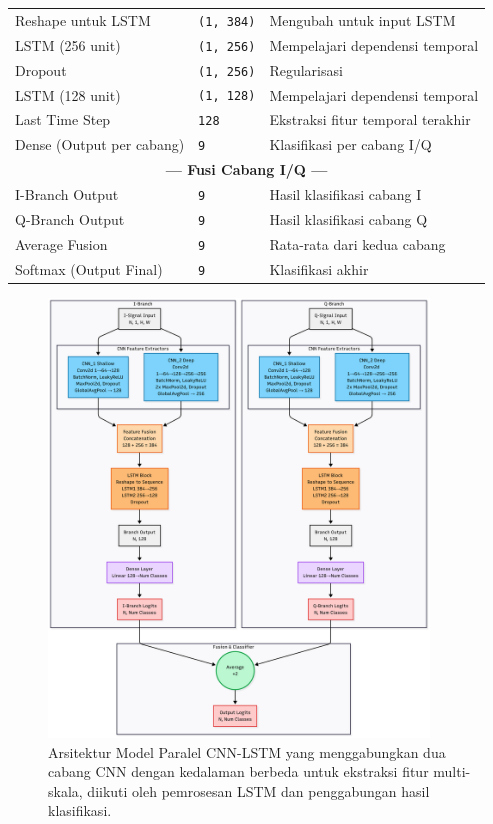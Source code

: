 \documentclass{article}
\begin{document}
\begin{table}[h]
\begin{tabular}{|l|l|l|}
Reshape untuk LSTM & \texttt{(1, 384)} & Mengubah untuk input LSTM \\
LSTM (256 unit) & \texttt{(1, 256)} & Mempelajari dependensi temporal \\
Dropout & \texttt{(1, 256)} & Regularisasi \\
LSTM (128 unit) & \texttt{(1, 128)} & Mempelajari dependensi temporal \\
Last Time Step & \texttt{128} & Ekstraksi fitur temporal terakhir \\
Dense (Output per cabang) & \texttt{9} & Klasifikasi per cabang I/Q \\
\hline
\multicolumn{3}{|c|}{\textbf{--- Fusi Cabang I/Q ---}} \\
\hline
I-Branch Output & \texttt{9} & Hasil klasifikasi cabang I \\
Q-Branch Output & \texttt{9} & Hasil klasifikasi cabang Q \\
Average Fusion & \texttt{9} & Rata-rata dari kedua cabang \\
Softmax (Output Final) & \texttt{9} & Klasifikasi akhir \\
\hline
\end{tabular}
\end{table}
\begin{figure}[H]
    \centerline{\includegraphics[width=0.9\textwidth,height=1.0\textheight]{Model/CNN_LSTM_Parallel.png}}
    \caption{Arsitektur Model Paralel CNN-LSTM yang menggabungkan dua cabang CNN dengan kedalaman berbeda untuk ekstraksi fitur multi-skala, diikuti oleh pemrosesan LSTM dan penggabungan hasil klasifikasi.}
    \label{fig:architecture_parallel}
\end{figure}
\end{document}
